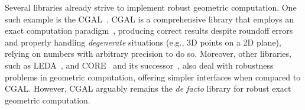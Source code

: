 Several libraries already strive to implement robust geometric computation.  One
such example is the \acf{CGAL}~\cite{CGAL:2018}.  \Ac{CGAL} is a comprehensive
library that employs an exact computation paradigm~\cite{Yap:1995:ECP},
producing correct results despite roundoff errors and properly handling
\textit{degenerate} situations (e.g., 3D points on a 2D plane), relying on
numbers with arbitrary precision to do so.  Moreover, other libraries, such as
\acs{LEDA}\label{acro:LEDA}~\cite{LEDA:2017,Mehlhorn:1989:LEDA}, and
CORE~\cite{Karamcheti:1999:CLRNGC} and its successor~\cite{Yu:2010:CORE2}, also
deal with robustness problems in geometric computation, offering simpler
interfaces when compared to \ac{CGAL}.  However, \ac{CGAL} arguably remains the
\textit{de facto} library for robust exact geometric computation.
